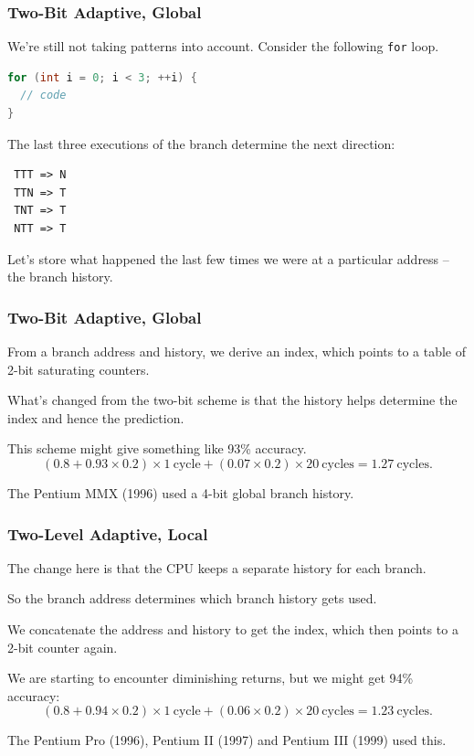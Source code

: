 \begin{frame}[fragile]
\frametitle{Two-Bit Adaptive, Global}

We're still not taking patterns into account. Consider the following {\tt for} loop.
\begin{lstlisting}[language=C]
for (int i = 0; i < 3; ++i) {
  // code
}
\end{lstlisting}
The last three executions of the branch determine the next direction:
\begin{verbatim}
 TTT => N
 TTN => T
 TNT => T
 NTT => T
\end{verbatim}

Let's store what happened the last few times we were at a particular address -- the
\alert{branch history}. 

\end{frame}



\begin{frame}
\frametitle{Two-Bit Adaptive, Global}

From a branch address and history, we derive an index, which
points to a table of 2-bit saturating counters. 

What's changed from the two-bit scheme
is that the history helps determine the index and hence the prediction.

This scheme might give something like 93\% accuracy.
\[
(0.8 + 0.93 \times 0.2) \times 1 \mathrm{~cycle} + (0.07 \times 0.2) \times 20 \mathrm{~cycles} = 1.27 \mathrm{~cycles}.
\]

The Pentium MMX (1996) used a 4-bit global branch history.

\end{frame}



\begin{frame}
\frametitle{Two-Level Adaptive, Local}


The change here is that the CPU keeps a separate history for each branch.


So the branch address determines which branch history gets used.


We concatenate the address and history to get the index, which then points to a
2-bit counter again. 

We are starting to encounter diminishing returns, but we might
get 94\% accuracy:
\[
(0.8 + 0.94 \times 0.2) \times 1 \mathrm{~cycle} + (0.06 \times 0.2) \times 20 \mathrm{~cycles} = 1.23 \mathrm{~cycles}.
\]

The Pentium Pro (1996), Pentium II (1997) and Pentium III (1999) used this.


\end{frame}



